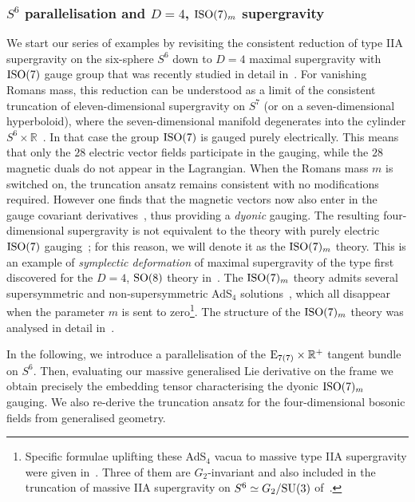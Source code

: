 \documentclass[debug]{phd}
\begin{document}
				\subsubsection{\texorpdfstring{$S^6$ parallelisation and $D=4$, $\mathrm{ISO}(7)_m$ supergravity}{S6 parallelisation and D=4, ISO(7)m supergravity}}
						We start our series of examples by revisiting the consistent reduction of type IIA supergravity on the six-sphere $S^6$ down to $D=4$ maximal supergravity with $\mathrm{ISO}(7)$ gauge group that was recently studied in detail in~\cite{Guarino:2015jca,Guarino:2015qaa,Guarino:2015vca}. 
						For vanishing Romans mass, this reduction can be understood as a limit of the consistent truncation of eleven-dimensional supergravity on $S^7$ (or on a seven-dimensional hyperboloid), where the seven-dimensional manifold degenerates into the cylinder $S^6 \times \mathbb {R}$~\cite{Hull:1988jw,Boonstra:1998mp}. 
						In that case the group $\mathrm{ISO}(7)$ is gauged purely electrically. 
						This means that only the $28$ electric vector fields participate in the gauging, while the $28$ magnetic duals do not appear in the Lagrangian. 
						When the Romans mass $m$ is switched on, the truncation ansatz remains consistent with no modifications required. 
						However one finds that the magnetic vectors now also enter in the gauge covariant derivatives~\cite{Guarino:2015vca}, thus providing a \emph{dyonic} gauging. 
						The resulting four-dimensional supergravity is not equivalent to the theory with purely electric $\mathrm{ISO}(7)$ gauging~\cite{Dall'Agata:2014ita}; for this reason, we will denote it as the $\mathrm{ISO}(7)_m$ theory.
						This is an example of \emph{symplectic deformation} of maximal supergravity of the type first discovered for the $D=4$, $\mathrm{SO}(8)$ theory in~\cite{Dall'Agata:2012bb}. 
						The $\mathrm{ISO}(7)_m$ theory admits several supersymmetric and non-supersymmetric AdS$_4$ solutions~\cite{DallAgata:2011aa,Gallerati:2014xra,Guarino:2015qaa}, which all disappear when the parameter $m$ is sent to zero\footnote{%
							Specific formulae uplifting these AdS$_4$ vacua to massive type IIA supergravity were given in~\cite{Guarino:2015jca,Guarino:2015vca,Varela:2015uca}. 
							Three of them are $G_2$-invariant and also included in the truncation of massive IIA supergravity on $S^6\simeq G_2/\mathrm{SU}(3)$ of~\cite{Cassani:2009ck}.%
							}.
						The structure of the $\mathrm{ISO}(7)_m$ theory was analysed in detail in~\cite{Guarino:2015qaa}.
						
						In the following, we introduce a parallelisation of the $\mathrm{E}_{7(7)}\times \mathbb{R}^+$ tangent bundle on $S^6$. 
						Then, evaluating our massive generalised Lie derivative on the frame we obtain precisely the embedding tensor characterising the dyonic $\mathrm{ISO}(7)_m$ gauging. 
						We also re-derive the truncation ansatz for the four-dimensional bosonic fields from generalised geometry.
						
\end{document}
